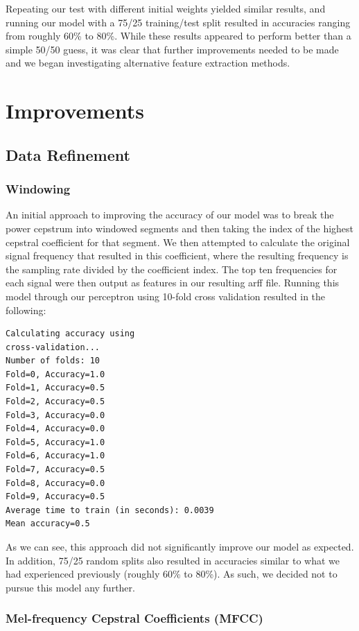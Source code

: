 \documentclass{article}
\begin{document}
Repeating our test with different initial weights yielded similar results, and running our model with a 75/25 training/test split resulted in accuracies ranging from roughly 60\% to 80\%.  While these results appeared to perform better than a simple 50/50 guess, it was clear that further improvements needed to be made and we began investigating alternative feature extraction methods.

\section{Improvements}

\subsection{Data Refinement}

\subsubsection{Windowing}

An initial approach to improving the accuracy of our model was to break the power cepstrum into windowed segments and then taking the index of the highest cepstral coefficient for that segment.  We then attempted to calculate the original signal frequency that resulted in this coefficient, where the resulting frequency is the sampling rate divided by the coefficient index.  The top ten frequencies for each signal were then output as features in our resulting arff file.  Running this model through our perceptron using 10-fold cross validation resulted in the following:

\begin{verbatim}
Calculating accuracy using
cross-validation...
Number of folds: 10
Fold=0, Accuracy=1.0
Fold=1, Accuracy=0.5
Fold=2, Accuracy=0.5
Fold=3, Accuracy=0.0
Fold=4, Accuracy=0.0
Fold=5, Accuracy=1.0
Fold=6, Accuracy=1.0
Fold=7, Accuracy=0.5
Fold=8, Accuracy=0.0
Fold=9, Accuracy=0.5
Average time to train (in seconds): 0.0039
Mean accuracy=0.5
\end{verbatim}

As we can see, this approach did not significantly improve our model as expected.  In addition, 75/25 random splits also resulted in accuracies similar to what we had experienced previously (roughly 60\% to 80\%).  As such, we decided not to pursue this model any further.

\subsubsection{Mel-frequency Cepstral Coefficients (MFCC)}
\end{document}
